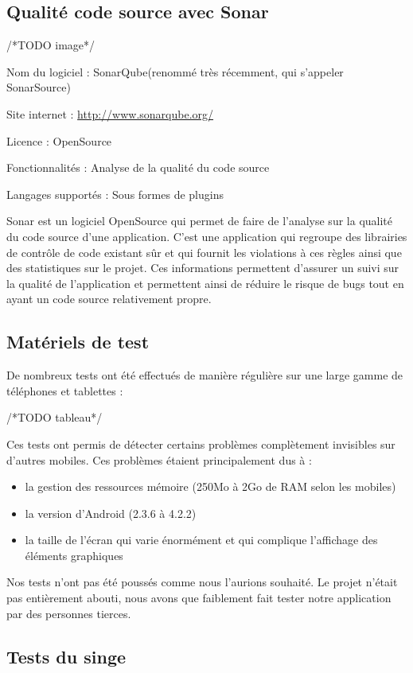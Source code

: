 \documentclass{report}
\begin{document}
\subsection{Qualité code source avec Sonar}

/*TODO image*/

Nom du logiciel : SonarQube(renommé très récemment, qui s'appeler SonarSource)

Site internet : \url{http://www.sonarqube.org/}

Licence : OpenSource

Fonctionnalités : Analyse de la qualité du code source

Langages supportés : Sous formes de plugins

Sonar est un logiciel OpenSource qui permet de faire de l’analyse sur la qualité du code source d’une application. C’est une application qui regroupe des librairies de contrôle de code existant sûr et qui fournit les violations à ces règles ainsi que des statistiques sur le projet. Ces informations permettent d’assurer un suivi sur la qualité de l’application et permettent ainsi de réduire le risque de bugs tout en ayant un code source relativement propre.

\subsection{Matériels de test}

De nombreux tests ont été effectués de manière régulière sur une large gamme de téléphones et tablettes :

/*TODO tableau*/

Ces tests ont permis de détecter certains problèmes complètement invisibles sur d’autres mobiles. Ces problèmes étaient principalement dus à :
\begin{itemize}
\item la gestion des ressources mémoire (250Mo à 2Go de RAM selon les mobiles)
\item la version d’Android (2.3.6 à 4.2.2)
\item la taille de l’écran qui varie énormément et qui complique l’affichage des éléments graphiques
\end{itemize}

Nos tests n’ont pas été poussés comme nous l’aurions souhaité. Le projet n’était pas entièrement abouti, nous avons que faiblement fait tester notre application par des personnes tierces.

\subsection{Tests du singe}
\end{document}
